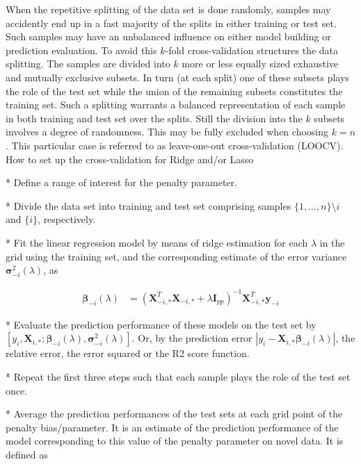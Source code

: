 %
When the repetitive splitting of the data set is done randomly,
samples may accidently end up in a fast majority of the splits in
either training or test set. Such samples may have an unbalanced
influence on either model building or prediction evaluation. To avoid
this $k$-fold cross-validation structures the data splitting. The
samples are divided into $k$ more or less equally sized exhaustive and
mutually exclusive subsets. In turn (at each split) one of these
subsets plays the role of the test set while the union of the
remaining subsets constitutes the training set. Such a splitting
warrants a balanced representation of each sample in both training and
test set over the splits. Still the division into the $k$ subsets
involves a degree of randomness. This may be fully excluded when
choosing $k=n$. This particular case is referred to as leave-one-out
cross-validation (LOOCV).
%
How to set up the cross-validation for Ridge and/or Lasso

* Define a range of interest for the penalty parameter.

* Divide the data set into training and test set comprising samples $\{1, \ldots, n\} \setminus i$ and $\{ i \}$, respectively.

* Fit the linear regression model by means of ridge estimation  for each $\lambda$ in the grid using the training set, and the corresponding estimate of the error variance $\boldsymbol{\sigma}_{-i}^2(\lambda)$, as

\begin{align*}
\boldsymbol{\beta}_{-i}(\lambda) & =  ( \boldsymbol{X}_{-i, \ast}^{T}
\boldsymbol{X}_{-i, \ast} + \lambda \boldsymbol{I}_{pp})^{-1}
\boldsymbol{X}_{-i, \ast}^{T} \boldsymbol{y}_{-i}
\end{align*}

* Evaluate the prediction performance of these models on the test set by $[y_i, \boldsymbol{X}_{i, \ast}; \boldsymbol{\beta}_{-i}(\lambda), \boldsymbol{\sigma}_{-i}^2(\lambda)]$. Or, by the prediction error $|y_i - \boldsymbol{X}_{i, \ast} \boldsymbol{\beta}_{-i}(\lambda)|$, the relative error, the error squared or the R2 score function.

* Repeat the first three steps  such that each sample plays the role of the test set once.

* Average the prediction performances of the test sets at each grid point of the penalty bias/parameter. It is an estimate of the prediction performance of the model corresponding to this value of the penalty parameter on novel data. It is defined as

